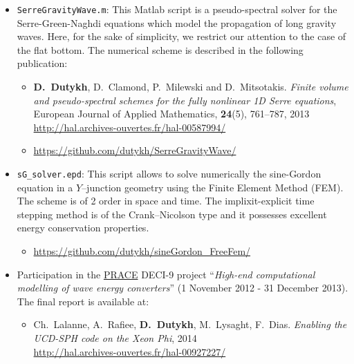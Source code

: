 \documentclass[final, a4paper, oneside, 12pt]{article}
\numberwithin{equation}{section}
\begin{document}
\begin{itemize}

  \item \texttt{SerreGravityWave.m}: This Matlab script is a pseudo-spectral solver for the Serre-Green-Naghdi equations which model the propagation of long gravity waves. Here, for the sake of simplicity, we restrict our attention to the case of the flat bottom. The numerical scheme is described in the following publication:
  
  \begin{itemize}
    \item \textbf{D.~Dutykh}, D.~Clamond, P.~Milewski and D.~Mitsotakis.
    \textit{Finite volume and pseudo-spectral schemes for the fully
    nonlinear 1D Serre equations}, European Journal of Applied 
    Mathematics, \textbf{24}(5), 761--787, 2013 \\
    \url{http://hal.archives-ouvertes.fr/hal-00587994/}
  \end{itemize}
  
  \begin{itemize}
    \item \url{https://github.com/dutykh/SerreGravityWave/}
  \end{itemize}
  
\end{itemize}

\begin{itemize}

  \item \texttt{sG\_solver.epd}: This script allows to solve numerically the sine-Gordon equation in a $Y$--junction geometry using the Finite Element Method (FEM). The scheme is of 2 order in space and time. The implixit-explicit time stepping method is of the Crank--Nicolson type and it possesses excellent energy conservation properties.
  
  \begin{itemize}
    \item \url{https://github.com/dutykh/sineGordon_FreeFem/}
  \end{itemize}
  
\end{itemize}

\begin{itemize}

  \item Participation in the \href{http://www.prace-ri.eu/}{PRACE} DECI-9 project ``\textit{High-end computational modelling of wave energy converters}'' (1 November 2012 - 31 December 2013). The final report is available at:
  
  \begin{itemize}
    \item Ch.~Lalanne, A.~Rafiee, \textbf{D.~Dutykh}, M.~Lysaght, F.~Dias. \textit{Enabling the UCD-SPH code on the Xeon Phi}, 2014 \\
  \url{http://hal.archives-ouvertes.fr/hal-00927227/}
  \end{itemize}

\end{itemize}
\end{document}
